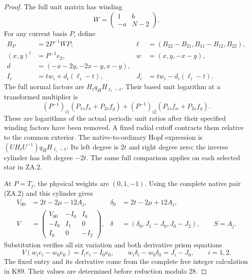 \begin{proof}
The full unit matrix has winding
\[
W=\begin{pmatrix}1&b\\-a&N-2\end{pmatrix}.
\]
For any current basis \(P\), define
\[
\begin{aligned}
B_P&=2P^{-1}WP,&
\ell&=(B_{22}-B_{21},B_{11}-B_{12},B_{22}),\\
(x,y)^t&=P^{-1}e_2,&w&=(x,y,-x-y),\\
d&=(-x-2y,-2x-y,x-y),\\
I_i&=tw_i+d_i(\ell_i-t),&
J_i&=tw_i-d_i(\ell_i-t).
\end{aligned}                                           \tag{ZA.6}
\]
The full normal factors are \(H_tq_HH_{\ell_i-t}\). Their based
unit logarithm at a transformed multiplier is
\[
(P^{-1})_{i1}(P_{1s}f_\kappa+P_{2s}f_g)
+(P^{-1})_{i2}(P_{1s}f_\alpha+P_{2s}f_\eta).
                                                               \tag{ZA.7}
\]
These are logarithms of the actual periodic unit ratios after their
specified winding factors have been removed. A fixed radial cutoff
contracts them relative to the common exterior. The native-to-ordinary
Hopf expression is
\((UH_tU^{-1})q_HH_{\ell_i-t}\). Its left degree is \(2t\) and
right degree zero; the inverse cylinder has left degree \(-2t\).
The same full comparison applies on each selected star in ZA.2.

At \(P=T_j\), the physical weights are \((0,1,-1)\).
Using the complete native pair (ZA.2) and this cylinder gives
\[
\begin{aligned}
V_{00}&=2t-2\mu-12A_j,&
\delta_0&=2t-2\mu+12A_j,\\
V&=\begin{pmatrix}
V_{00}&-I_0&I_0\\-I_0&I_1&0\\I_0&0&-I_2
\end{pmatrix},&
\delta&=(\delta_0,J_1-J_0,J_0-J_2),\qquad S=A_j.
\end{aligned}                                           \tag{ZA.8}
\]
Substitution verifies all six variation and both derivative prism
equations
\[
V(w_i e_i-w_0e_0)=I_ie_i-I_0e_0,\qquad
w_i\delta_i-w_0\delta_0=J_i-J_0,\qquad i=1,2.
                                                               \tag{ZA.9}
\]
The fixed entry and its derivative come from the complete free
integer calculation in K89. Their values are determined before
reduction modulo 28.

\par


\end{proof}
